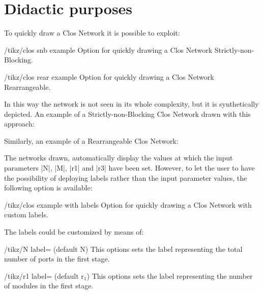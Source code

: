 \documentclass{ltxdoc}
\begin{document}
\section{Didactic purposes}
\label{sec:dida}
To quickly draw a Clos Network  it is possible to exploit:
\begin{key}{/tikz/clos snb example}
    Option for quickly drawing a Clos Network Strictly-non-Blocking.
\end{key}
\begin{key}{/tikz/clos rear example}
    Option for quickly drawing a Clos Network Rearrangeable.
\end{key}
In this way the network is not seen in its whole complexity, but it is synthetically  depicted. An example of a Strictly-non-Blocking Clos Network drawn with this approach:
\begin{codeexample}[]
\end{codeexample}

Similarly, an example of a Rearrangeable Clos Network:
\begin{codeexample}[]
\end{codeexample}

The networks drawn, automatically display the values at which the input parameters |N|, |M|, |r1| and |r3| have been set. However, to let the user to have the possibility of deploying labels rather than the input parameter values, the following option is available:

\begin{key}{/tikz/clos example with labels}
    Option for quickly drawing a Clos Network with custom labels.
\end{key}

The labels could be customized by means of:
\begin{key}{/tikz/N label= (default N)}
    This options sets the label representing the total number of ports in the first stage.
\end{key}

\begin{key}{/tikz/r1 label= (default r$_1$)}
    This options sets the label representing the number of modules in the first stage.
\end{key}
\end{document}
